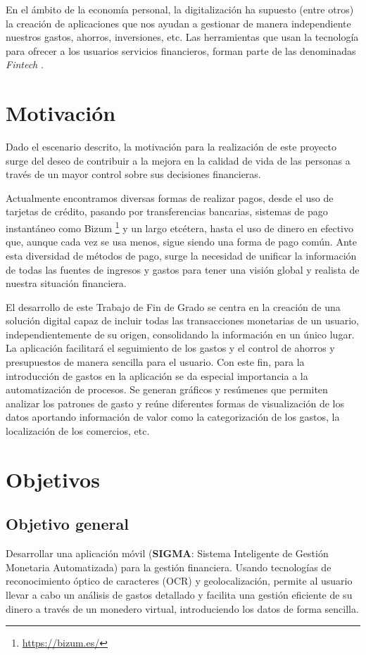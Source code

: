 En el ámbito de la economía personal, la digitalización ha supuesto (entre 
otros) la creación de aplicaciones que nos ayudan a gestionar de manera independiente nuestros 
gastos, ahorros, inversiones, etc. Las herramientas que usan la tecnología para ofrecer a los usuarios servicios financieros, forman parte de las denominadas \textit{Fintech} \cite{schueffel2016taming}.

\section{Motivación}
Dado el escenario descrito, la motivación para la realización de este proyecto surge del deseo 
de contribuir a la mejora en la calidad de vida de las personas a través de un mayor control 
sobre sus decisiones financieras.

Actualmente encontramos diversas formas de realizar pagos, desde el uso de tarjetas de crédito,
pasando por transferencias bancarias, sistemas de pago instantáneo como Bizum \footnote{\url{https://bizum.es/}} y un largo etcétera, hasta el uso de dinero en efectivo que, aunque cada vez se usa menos, sigue siendo una forma de pago común. Ante esta diversidad de métodos de pago, surge la necesidad de  unificar la información de todas las fuentes de ingresos y gastos para tener una visión global y 
realista de nuestra situación financiera.

El desarrollo de este Trabajo de Fin de Grado se centra en la creación de una solución digital 
capaz de incluir todas las transacciones monetarias de un usuario, independientemente de su 
origen, consolidando la información en un único lugar. La aplicación facilitará el seguimiento de los gastos y el control de ahorros y presupuestos de manera sencilla para el usuario. Con este fin, para la introducción de gastos en la aplicación se da especial importancia a la automatización 
de procesos. Se generan gráficos y resúmenes que permiten analizar los
patrones de gasto y reúne diferentes formas de visualización de los datos aportando información 
de valor como la categorización de los gastos, la localización de los comercios, etc.\\

\section{Objetivos} \label{sect:goals}
\subsection{Objetivo general}
Desarrollar una aplicación móvil (\textbf{SIGMA}: Sistema Inteligente de Gestión Monetaria Automatizada) 
para la gestión financiera. Usando tecnologías de reconocimiento
óptico de caracteres (OCR) y geolocalización, permite al usuario llevar a cabo un 
análisis de gastos detallado y facilita una gestión eficiente de su dinero
a través de un monedero virtual, introduciendo los datos de 
forma sencilla.

